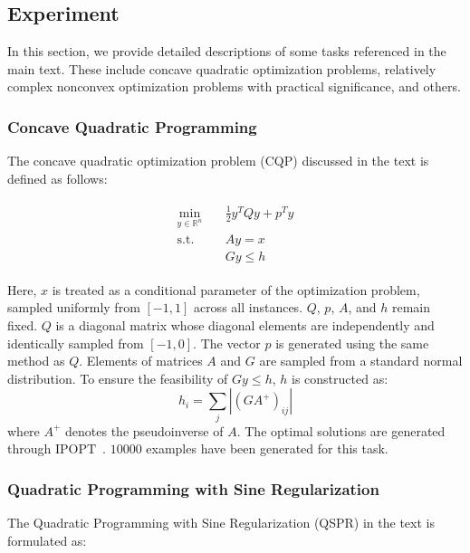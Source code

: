 \subsection{Experiment}
In this section, we provide detailed descriptions of some tasks referenced in the main text. These include concave quadratic optimization problems, relatively complex nonconvex optimization problems with practical significance, and others.  

\subsubsection{Concave Quadratic Programming}  
\label{appendix:exper-cqp}

The concave quadratic optimization problem (CQP) discussed in the text is defined as follows: 

\begin{align}  
\begin{aligned}
\min_{y\in \mathbb{R}^n}\quad & \frac{1}{2}y^TQy + p^Ty\\  
\mathrm{s.t.}   \quad & Ay = x\\  
                \quad & Gy \leq h
\end{aligned}
\end{align}  
 
Here, \( x \) is treated as a conditional parameter of the optimization problem, sampled uniformly from \([-1,1]\) across all instances. \( Q \), \( p \), \( A \), and \( h \) remain fixed. \( Q \) is a diagonal matrix whose diagonal elements are independently and identically sampled from \([-1,0]\). The vector \( p \) is generated using the same method as \( Q \). Elements of matrices \( A \) and \( G \) are sampled from a standard normal distribution. To ensure the feasibility of \( Gy \leq h \), \( h \) is constructed as:  
\begin{equation}  
h_i = \sum_{j}|(GA^+)_{ij}|  
\end{equation}
where \( A^+ \) denotes the pseudoinverse of \( A \). The optimal solutions are generated through \(\text{IPOPT}\)~\cite{wachter2006implementation}. \(10000\) examples have been generated for this task.

\subsubsection{Quadratic Programming with Sine Regularization}  
\label{appendix:exper-ncp}

The Quadratic Programming with Sine Regularization (QSPR) in the text is formulated as:  

